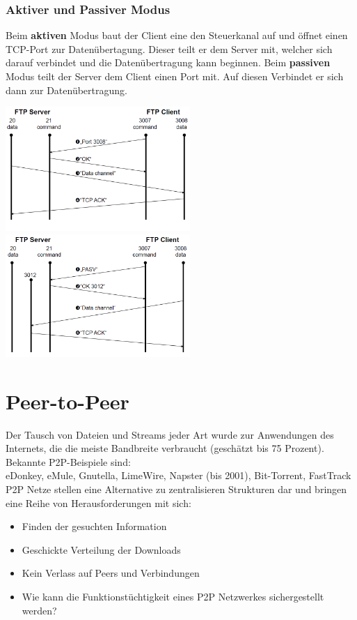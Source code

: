 \documentclass{article} %
\begin{document}
\subsubsection{Aktiver und Passiver Modus}

Beim \textbf{aktiven} Modus baut der Client eine den Steuerkanal auf und öffnet einen TCP-Port zur Datenübertagung.
Dieser teilt er dem Server mit, welcher sich darauf verbindet und die Datenübertragung kann beginnen.
Beim \textbf{passiven} Modus teilt der Server dem  Client einen Port mit.
Auf diesen Verbindet er sich dann zur Datenübertragung.

\begin{center}
	\includegraphics[width=7cm]{img/ftp_active}
	\includegraphics[width=7cm]{img/ftp_passive}	
\end{center}	


\section{Peer-to-Peer}
Der Tausch von Dateien und Streams jeder Art wurde zur Anwendungen des Internets, die die meiste Bandbreite verbraucht (geschätzt bis 75 Prozent). Bekannte P2P-Beispiele sind: \\
eDonkey, eMule, Gnutella, LimeWire, Napster (bis 2001), Bit-Torrent, FastTrack\\


P2P Netze stellen eine Alternative zu zentralisieren Strukturen dar und bringen eine Reihe von Herausforderungen mit sich:
	\begin{itemize}
	\item Finden der gesuchten Information
	\item Geschickte Verteilung der Downloads
	\item Kein Verlass auf Peers und Verbindungen
	\item Wie kann die Funktionstüchtigkeit eines P2P Netzwerkes sichergestellt werden?
	\end{itemize}
\end{document}
